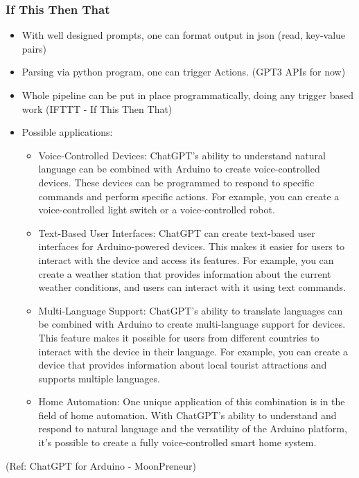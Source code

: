 \begin{frame}[fragile]\frametitle{If This Then That}


\begin{itemize}
\item With well designed prompts, one can format output in json (read, key-value pairs)
\item Parsing via python program, one can trigger Actions. (GPT3 APIs for now)
\item Whole pipeline can be put in place programmatically, doing any trigger based work (IFTTT - If This Then That)
\item Possible applications:
\begin{itemize}
\item Voice-Controlled Devices: ChatGPT’s ability to understand natural language can be combined with Arduino to create voice-controlled devices. These devices can be programmed to respond to specific commands and perform specific actions. For example, you can create a voice-controlled light switch or a voice-controlled robot. 
\item Text-Based User Interfaces: ChatGPT can create text-based user interfaces for Arduino-powered devices. This makes it easier for users to interact with the device and access its features. For example, you can create a weather station that provides information about the current weather conditions, and users can interact with it using text commands.
\item Multi-Language Support: ChatGPT’s ability to translate languages can be combined with Arduino to create multi-language support for devices. This feature makes it possible for users from different countries to interact with the device in their language. For example, you can create a device that provides information about local tourist attractions and supports multiple languages.
\item Home Automation: One unique application of this combination is in the field of home automation. With ChatGPT’s ability to understand and respond to natural language and the versatility of the Arduino platform, it’s possible to create a fully voice-controlled smart home system. 
\end{itemize}	 

\end{itemize}	 


\tiny{(Ref: ChatGPT for Arduino - MoonPreneur)}
\end{frame}
